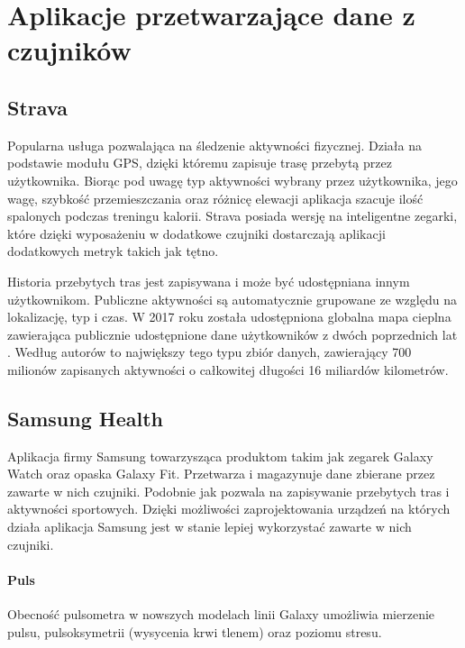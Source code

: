 \section{Aplikacje przetwarzające dane z czujników}

\subsection{Strava}
\label{sec:strava}
Popularna usługa pozwalająca na śledzenie aktywności fizycznej. Działa na podstawie modułu GPS, dzięki któremu zapisuje trasę przebytą przez użytkownika. Biorąc pod uwagę typ aktywności wybrany przez użytkownika, jego wagę, szybkość przemieszczania oraz różnicę elewacji aplikacja szacuje ilość spalonych podczas treningu kalorii. Strava posiada wersję na inteligentne zegarki, które dzięki wyposażeniu w dodatkowe czujniki dostarczają aplikacji dodatkowych metryk takich jak tętno. 

Historia przebytych tras jest zapisywana i może być udostępniana innym użytkownikom. Publiczne aktywności są automatycznie grupowane ze względu na lokalizację, typ i czas. W 2017 roku została udostępniona globalna mapa cieplna zawierająca publicznie udostępnione dane użytkowników z dwóch poprzednich lat \cite{Strava_Heatmap}. Według autorów to największy tego typu zbiór danych, zawierający 700 milionów zapisanych aktywności o całkowitej długości 16 miliardów kilometrów.


\subsection{Samsung Health}
Aplikacja firmy Samsung towarzysząca produktom takim jak zegarek Galaxy Watch oraz opaska Galaxy Fit. Przetwarza i magazynuje dane zbierane przez zawarte w nich czujniki. Podobnie jak  pozwala na zapisywanie przebytych tras i aktywności sportowych. Dzięki możliwości zaprojektowania urządzeń na których działa aplikacja Samsung jest w stanie lepiej wykorzystać zawarte w nich czujniki.

\paragraph{Puls} Obecność pulsometra w nowszych modelach linii Galaxy umożliwia mierzenie pulsu, pulsoksymetrii (wysycenia krwi tlenem) oraz poziomu stresu. 

